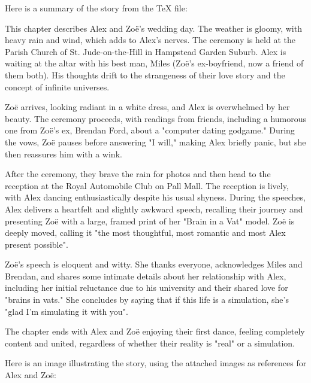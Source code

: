 Here is a summary of the story from the TeX file:

This chapter describes Alex and Zoë's wedding day. The weather is gloomy, with heavy rain and wind, which adds to Alex's nerves. The ceremony is held at the Parish Church of St. Jude-on-the-Hill in Hampstead Garden Suburb. Alex is waiting at the altar with his best man, Miles (Zoë's ex-boyfriend, now a friend of them both). His thoughts drift to the strangeness of their love story and the concept of infinite universes.

Zoë arrives, looking radiant in a white dress, and Alex is overwhelmed by her beauty. The ceremony proceeds, with readings from friends, including a humorous one from Zoë's ex, Brendan Ford, about a "computer dating godgame." During the vows, Zoë pauses before answering "I will," making Alex briefly panic, but she then reassures him with a wink.

After the ceremony, they brave the rain for photos and then head to the reception at the Royal Automobile Club on Pall Mall. The reception is lively, with Alex dancing enthusiastically despite his usual shyness. During the speeches, Alex delivers a heartfelt and slightly awkward speech, recalling their journey and presenting Zoë with a large, framed print of her "Brain in a Vat" model. Zoë is deeply moved, calling it "the most thoughtful, most romantic and most Alex present possible".

Zoë's speech is eloquent and witty. She thanks everyone, acknowledges Miles and Brendan, and shares some intimate details about her relationship with Alex, including her initial reluctance due to his university and their shared love for "brains in vats." She concludes by saying that if this life is a simulation, she's "glad I'm simulating it with you".

The chapter ends with Alex and Zoë enjoying their first dance, feeling completely content and united, regardless of whether their reality is "real" or a simulation.

Here is an image illustrating the story, using the attached images as references for Alex and Zoë:
